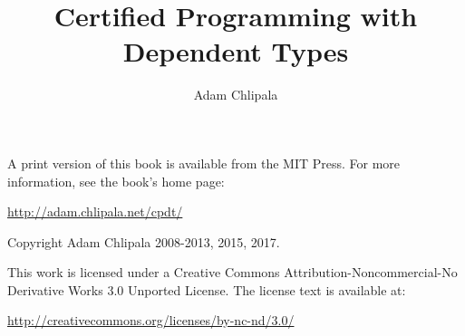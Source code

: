 \documentclass[12pt]{jreport}
\title{Certified Programming with Dependent Types}
\author{Adam Chlipala}
\begin{document}
\maketitle

A print version of this book is available from the MIT Press.  For more information, see the book's home page:

\begin{center} \url{http://adam.chlipala.net/cpdt/} \end{center}

\thispagestyle{empty}
\mbox{}\vfill
\begin{center}

Copyright Adam Chlipala 2008-2013, 2015, 2017.


This work is licensed under a
Creative Commons Attribution-Noncommercial-No Derivative Works 3.0
Unported License.
The license text is available at:

\end{center}

\begin{center} \url{http://creativecommons.org/licenses/by-nc-nd/3.0/} \end{center}

\tableofcontents




















\clearpage
{}



\clearpage
{}
\printindex
\end{document}
